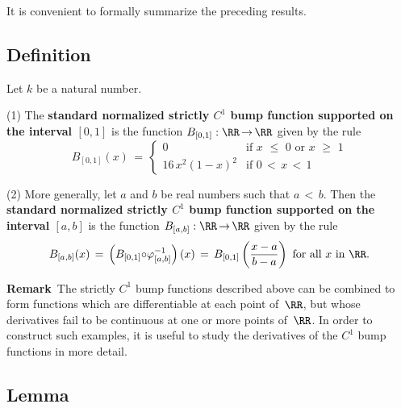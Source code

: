 {\V

        It is convenient to formally summarize the preceding results.

\V

            \subsection{\small{\bf Definition}}
            \label{DefE35.110}

\V

        Let $k$ be a natural number.

\V

        (1) The {\bf standard normalized strictly $C^{1}$ bump function supported on the interval $[0,1]$}
    is the function $B_{[0,1]}:{\RR} \,{\rightarrow}\, {\RR}$ given by the rule
        \begin{displaymath}
        B_{[0,1]}(x) \,=\, 
            \left\{
        \begin{array}{cl}
              0        & \mbox{if $x\,\,{\leq}\,\,0$ or $x\,\,{\geq}\,\,1$} \\
    16\,x^{2}(1-x)^{2} & \mbox{if $0\,<\,x\,<\,1$}
        \end{array}
                        \right.
        \end{displaymath}


\V

        (2) More generally, let $a$ and $b$ be real numbers such that $a\,<\,b$. 
    Then the {\bf standard normalized strictly $C^{1}$ bump function supported on the interval $[a,b]$} is the function $B_{[a,b]}:{\RR} \,{\rightarrow}\, {\RR}$ given by the rule
        \begin{displaymath}
        B_{[a,b]}(x) \,=\,\left(B_{[0,1]}{\circ}{\varphi}^{-1}_{[a,b]}\right)(x) \,=\,  B_{[0,1]}\left(\frac{x-a}{b-a}\right) \mbox{ for all $x$ in ${\RR}$}.
        \end{displaymath}

\VV

       {\bf Remark}\, The strictly $C^{1}$ bump functions described above can be combined to form functions
    which are differentiable at each point of~${\RR}$, but whose derivatives fail to be continuous at one or more points of~${\RR}$.
    In order to construct such examples, it is useful to study the derivatives of the $C^{1}$ bump functions in more detail.

\V

            \subsection{\small{\bf Lemma}}
            \label{LemmaE35.120}

}

